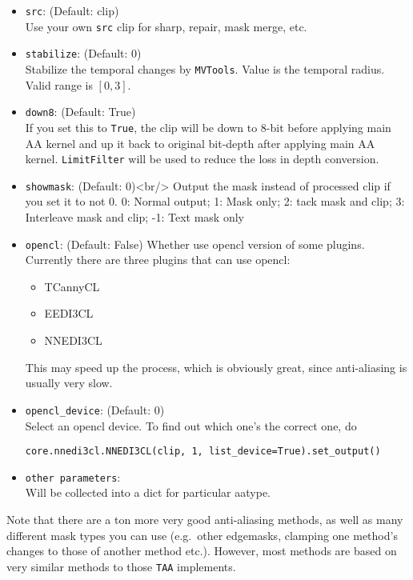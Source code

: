 \documentclass{scrartcl}
\begin{document}
\begin{itemize}
\item \texttt{src}: (Default: clip) \\
    Use your own \texttt{src} clip for sharp, repair, mask merge, etc. 

\item \texttt{stabilize}: (Default: 0)\\ 
    Stabilize the temporal changes by \texttt{MVTools}. 
    Value is the temporal radius. Valid range is $[0, 3]$. 

\item \texttt{down8}: (Default: True) \\
    If you set this to \texttt{True}, the clip will be down to 8-bit before applying main AA kernel
	and up it back to original bit-depth after applying main AA kernel. 
	\texttt{LimitFilter} will be used to reduce the loss in depth conversion. 

\item \texttt{showmask}: (Default: 0)<br/>
    Output the mask instead of processed clip if you set it to not 0. 
    0: Normal output; 1: Mask only; 2: tack mask and clip; 3: Interleave mask and clip; -1: Text mask only 

\item \texttt{opencl}: (Default: False) 
    Whether use opencl version of some plugins. 
    Currently there are three plugins that can use opencl: 
\begin{itemize}    
    \item TCannyCL
    \item EEDI3CL
    \item NNEDI3CL
     \end{itemize}
This may speed up the process, which is obviously great, since anti-aliasing is usually very slow.

\item  \texttt{opencl\_device}: (Default: 0)\\
Select an opencl device.  To find out which one's the correct one, do
\begin{lstlisting}
core.nnedi3cl.NNEDI3CL(clip, 1, list_device=True).set_output()
\end{lstlisting}

\item \texttt{other parameters}:\\
Will be collected into a dict for particular aatype.
\end{itemize}

Note that there are a ton more very good anti-aliasing methods, as well as many different mask types you can use (e.g.\ other edgemasks, clamping one method's changes to those of another method etc.).  However, most methods are based on very similar methods to those \texttt{TAA} implements.
\end{document}
